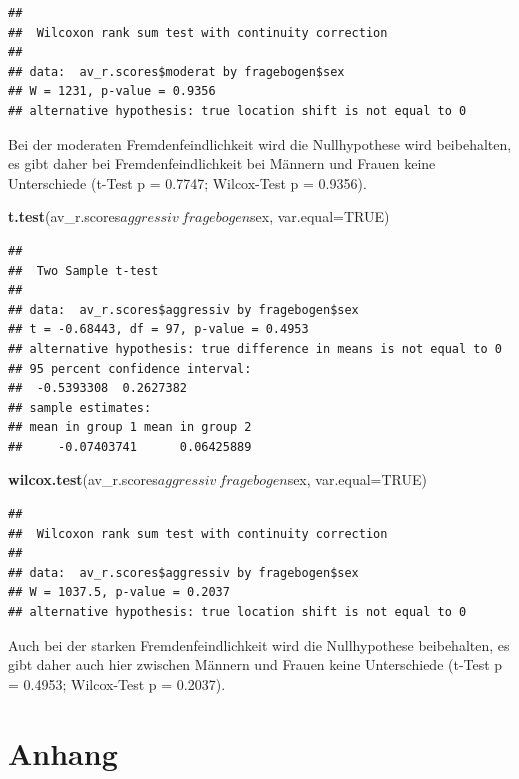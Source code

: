 \documentclass[]{article}
\newenvironment{Shaded}{\begin{snugshade}}{\end{snugshade}}
\newcommand{\KeywordTok}[1]{\textcolor[rgb]{0.13,0.29,0.53}{\textbf{{#1}}}}
\newcommand{\DataTypeTok}[1]{\textcolor[rgb]{0.13,0.29,0.53}{{#1}}}
\newcommand{\OtherTok}[1]{\textcolor[rgb]{0.56,0.35,0.01}{{#1}}}
\newcommand{\NormalTok}[1]{{#1}}
\begin{document}
\begin{verbatim}
## 
##  Wilcoxon rank sum test with continuity correction
## 
## data:  av_r.scores$moderat by fragebogen$sex
## W = 1231, p-value = 0.9356
## alternative hypothesis: true location shift is not equal to 0
\end{verbatim}

Bei der moderaten Fremdenfeindlichkeit wird die Nullhypothese wird
beibehalten, es gibt daher bei Fremdenfeindlichkeit bei Männern und
Frauen keine Unterschiede (t-Test p = 0.7747; Wilcox-Test p = 0.9356).

\begin{Shaded}
\begin{Highlighting}[]
\KeywordTok{t.test}\NormalTok{(av_r.scores$aggressiv~fragebogen$sex, }\DataTypeTok{var.equal=}\OtherTok{TRUE}\NormalTok{)}
\end{Highlighting}
\end{Shaded}

\begin{verbatim}
## 
##  Two Sample t-test
## 
## data:  av_r.scores$aggressiv by fragebogen$sex
## t = -0.68443, df = 97, p-value = 0.4953
## alternative hypothesis: true difference in means is not equal to 0
## 95 percent confidence interval:
##  -0.5393308  0.2627382
## sample estimates:
## mean in group 1 mean in group 2 
##     -0.07403741      0.06425889
\end{verbatim}

\begin{Shaded}
\begin{Highlighting}[]
\KeywordTok{wilcox.test}\NormalTok{(av_r.scores$aggressiv~fragebogen$sex, }\DataTypeTok{var.equal=}\OtherTok{TRUE}\NormalTok{)}
\end{Highlighting}
\end{Shaded}

\begin{verbatim}
## 
##  Wilcoxon rank sum test with continuity correction
## 
## data:  av_r.scores$aggressiv by fragebogen$sex
## W = 1037.5, p-value = 0.2037
## alternative hypothesis: true location shift is not equal to 0
\end{verbatim}

Auch bei der starken Fremdenfeindlichkeit wird die Nullhypothese
beibehalten, es gibt daher auch hier zwischen Männern und Frauen keine
Unterschiede (t-Test p = 0.4953; Wilcox-Test p = 0.2037).

\clearpage
\section{Anhang}
\end{document}
